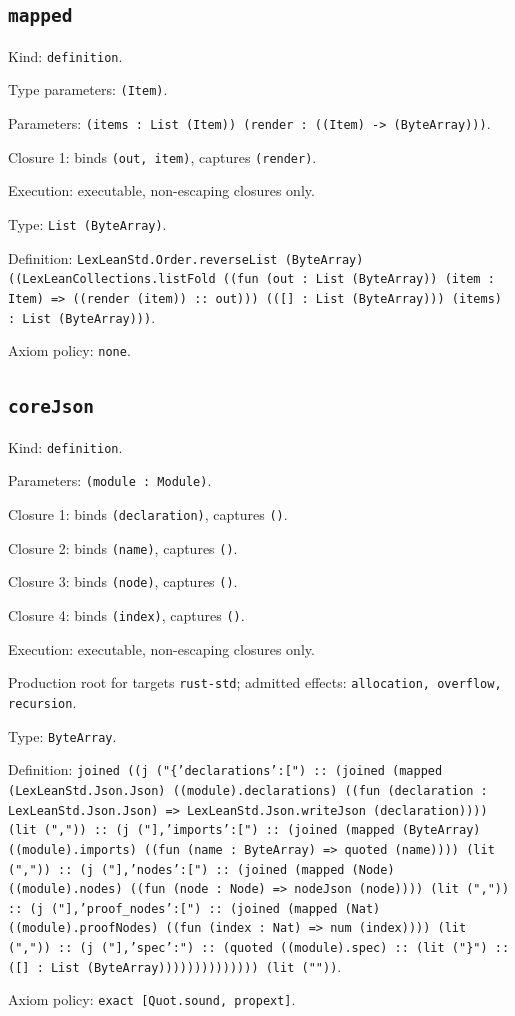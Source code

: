 \documentclass[11pt]{article}
\begin{document}
\subsection*{\texttt{mapped}}
\noindent Kind: \texttt{definition}.\par
\noindent Type parameters: \texttt{(Item)}.\par
\noindent Parameters: \texttt{(items : List (Item)) (render : ((Item) -> (ByteArray)))}.\par
\noindent Closure 1: binds \texttt{(out, item)}, captures \texttt{(render)}.\par
\noindent Execution: executable, non-escaping closures only.\par
\noindent Type: \texttt{List (ByteArray)}.\par
\noindent Definition: \texttt{LexLeanStd.Order.reverseList (ByteArray) ((LexLeanCollections.listFold ((fun (out : List (ByteArray)) (item : Item) => ((render (item)) :: out))) (([] : List (ByteArray))) (items) : List (ByteArray)))}.\par
\noindent Axiom policy: \texttt{none}.\par
\subsection*{\texttt{coreJson}}
\noindent Kind: \texttt{definition}.\par
\noindent Parameters: \texttt{(module : Module)}.\par
\noindent Closure 1: binds \texttt{(declaration)}, captures \texttt{()}.\par
\noindent Closure 2: binds \texttt{(name)}, captures \texttt{()}.\par
\noindent Closure 3: binds \texttt{(node)}, captures \texttt{()}.\par
\noindent Closure 4: binds \texttt{(index)}, captures \texttt{()}.\par
\noindent Execution: executable, non-escaping closures only.\par
\noindent Production root for targets \texttt{rust-std}; admitted effects: \texttt{allocation, overflow, recursion}.\par
\noindent Type: \texttt{ByteArray}.\par
\noindent Definition: \texttt{joined ((j ("\{'declarations':[") :: (joined (mapped (LexLeanStd.Json.Json) ((module).declarations) ((fun (declaration : LexLeanStd.Json.Json) => LexLeanStd.Json.writeJson (declaration)))) (lit (",")) :: (j ("],'imports':[") :: (joined (mapped (ByteArray) ((module).imports) ((fun (name : ByteArray) => quoted (name)))) (lit (",")) :: (j ("],'nodes':[") :: (joined (mapped (Node) ((module).nodes) ((fun (node : Node) => nodeJson (node)))) (lit (",")) :: (j ("],'proof\_nodes':[") :: (joined (mapped (Nat) ((module).proofNodes) ((fun (index : Nat) => num (index)))) (lit (",")) :: (j ("],'spec':") :: (quoted ((module).spec) :: (lit ("\}") :: ([] : List (ByteArray)))))))))))))) (lit (""))}.\par
\noindent Axiom policy: \texttt{exact [Quot.sound, propext]}.\par
\end{document}
